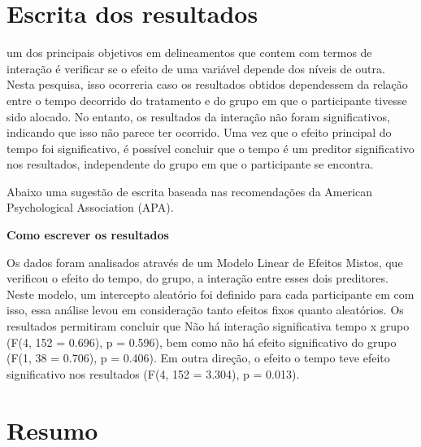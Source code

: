 \documentclass[
]{book}
\begin{document}
\hypertarget{escrita-dos-resultados-10}{%
\section{Escrita dos resultados}\label{escrita-dos-resultados-10}}

um dos principais objetivos em delineamentos que contem com termos de
interação é verificar se o efeito de uma variável depende dos níveis de
outra. Nesta pesquisa, isso ocorreria caso os resultados obtidos
dependessem da relação entre o tempo decorrido do tratamento e do grupo
em que o participante tivesse sido alocado. No entanto, os resultados da
interação não foram significativos, indicando que isso não parece ter
ocorrido. Uma vez que o efeito principal do tempo foi significativo, é
possível concluir que o tempo é um preditor significativo nos
resultados, independente do grupo em que o participante se encontra.

Abaixo uma sugestão de escrita baseada nas recomendações da American
Psychological Association (APA).

\begin{writing}
\textbf{Como escrever os resultados}

Os dados foram analisados através de um Modelo Linear de Efeitos Mistos,
que verificou o efeito do tempo, do grupo, a interação entre esses dois
preditores. Neste modelo, um intercepto aleatório foi definido para cada
participante em com isso, essa análise levou em consideração tanto
efeitos fixos quanto aleatórios. Os resultados permitiram concluir que
Não há interação significativa tempo x grupo (F(4, 152 = 0.696), p =
0.596), bem como não há efeito significativo do grupo (F(1, 38 = 0.706),
p = 0.406). Em outra direção, o efeito o tempo teve efeito significativo
nos resultados (F(4, 152 = 3.304), p = 0.013).
\end{writing}

\hypertarget{resumo-10}{%
\section{Resumo}\label{resumo-10}}
\end{document}
